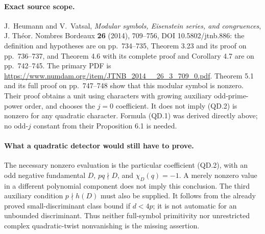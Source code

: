 \paragraph{Exact source scope.}
J.~Heumann and V.~Vatsal, \emph{Modular symbols, Eisenstein series,
and congruences}, J. Th\'eor. Nombres Bordeaux \textbf{26} (2014),
709--756, DOI 10.5802/jtnb.886: the definition and hypotheses are on
pp.~734--735, Theorem 3.23 and its proof on pp.~736--737, and
Theorem 4.6 with its complete proof and Corollary 4.7 are on
pp.~742--745.  The primary PDF is
\url{https://www.numdam.org/item/JTNB_2014__26_3_709_0.pdf}.
Theorem 5.1 and its full proof on pp.~747--748 show that this modular
symbol is nonzero.  Their proof obtains a unit using characters with
growing auxiliary odd-prime-power order, and chooses the $j=0$
coefficient.  It does not imply (QD.2) is nonzero for any quadratic
character.  Formula (QD.1) was derived directly above; no odd-$j$
constant from their Proposition 6.1 is needed.

\paragraph{What a quadratic detector would still have to prove.}
The necessary nonzero evaluation is the particular coefficient (QD.2),
with an odd negative fundamental $D$, $p q\nmid D$, and
$\chi_D(q)=-1$.  A merely nonzero value in a different polynomial
component does not imply this conclusion.  The third auxiliary
condition $p\nmid h(D)$ must also be supplied.  It follows from the
already proved small-discriminant class bound if $d<4p$; it is not
automatic for an unbounded discriminant.  Thus neither full-symbol
primitivity nor unrestricted complex quadratic-twist nonvanishing is
the missing assertion.
